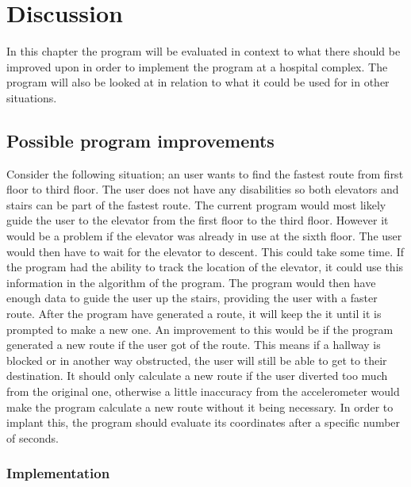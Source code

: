 \chapter{Discussion}

In this chapter the program will be evaluated in context to what there should be improved upon in order to implement the program at a hospital complex. The program will also be looked at in relation to what it could be used for in other situations.

\section{Possible program improvements}

Consider the following situation; an user wants to find the fastest route from first floor to third floor. The user does not have any disabilities so both elevators and stairs can be part of the fastest route. The current program would most likely guide the user to the elevator from the first floor to the third floor. However it would be a problem if the elevator was already in use at the sixth floor. The user would then have to wait for the elevator to descent. This could take some time. If the program had the ability to track the location of the elevator, it could use this information in the algorithm of the program. The program would then have enough data to guide the user up the stairs, providing the user with a faster route. 
\newline
After the program have generated a route, it will keep the it until it is prompted to make a new one. An improvement to this would be if the program generated a new route if the user got of the route. This means if a hallway is blocked or in another way obstructed, the user will still be able to get to their destination. It should only calculate a new route if the user diverted too much from the original one, otherwise a little inaccuracy from the accelerometer would make the program calculate a new route without it being necessary. In order to implant this, the program should evaluate its coordinates
after a specific number of seconds.

\subsection{Implementation}

